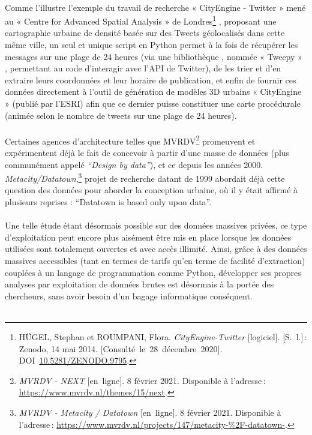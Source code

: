 \documentclass[
  11pt,
  french,
]{article}
\begin{document}
~\\
Comme l'illustre l'exemple du travail de recherche « CityEngine -
Twitter » mené au « Centre for Advanced Spatial Analysis » de
Londres\footnote{HÜGEL, Stephan et ROUMPANI, Flora.
  \emph{{CityEngine}-Twitter} {[}logiciel{]}. {[}S.~l.{]}\,: Zenodo, 14
  mai 2014. {[}Consulté~le~28~décembre~2020{]}.
  DOI~\href{https://doi.org/10.5281/ZENODO.9795}{10.5281/ZENODO.9795}.}
, proposant une cartographie urbaine de densité basée sur des Tweets
géolocalisés dans cette même ville, un seul et unique script en Python
permet à la fois de récupérer les messages sur une plage de 24 heures
(via une bibliothèque , nommée « Tweepy » , permettant au code
d'interagir avec l'API de Twitter), de les trier et d'en extraire leurs
coordonnées et leur horaire de publication, et enfin de fournir ces
données directement à l'outil de génération de modèles 3D urbains «
CityEngine » (publié par l'ESRI) afin que ce dernier puisse constituer
une carte procédurale (animée selon le nombre de tweets sur une plage de
24 heures).\\
~\\
Certaines agences d'architecture telles que MVRDV\footnote{\emph{MVRDV -
  NEXT} {[}en~ligne{]}. 8 février 2021. Disponible à l'adresse\,:
  \url{https://www.mvrdv.nl/themes/15/next}.} promeuvent et
expérimentent déjà le fait de concevoir à partir d'une masse de données
(plus communément appelé \emph{``Design by data''}), et ce depuis les
années 2000. \emph{Metacity/Datatown},\footnote{\emph{MVRDV - Metacity /
  Datatown} {[}en~ligne{]}. 8 février 2021. Disponible à l'adresse\,:
  \url{https://www.mvrdv.nl/projects/147/metacity-\%2F-datatown-}.}
projet de recherche datant de 1999 abordait déjà cette question des
données pour aborder la conception urbaine, où il y était affirmé à
plusieurs reprises : ``Datatown is based only upon data''.\\
~\\
Une telle étude étant désormais possible sur des données massives
privées, ce type d'exploitation peut encore plus aisément être mis en
place lorsque les données utilisées sont totalement ouvertes et avec
accès illimité. Ainsi, grâce à des données massives accessibles (tant en
termes de tarifs qu'en terme de facilité d'extraction) couplées à un
langage de programmation comme Python, développer ses propres analyses
par exploitation de données brutes est désormais à la portée des
chercheurs, sans avoir besoin d'un bagage informatique conséquent.\\
~\\
\end{document}
